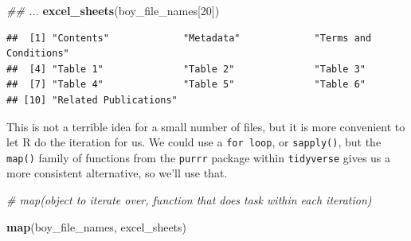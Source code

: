 \documentclass[
]{book}
\newenvironment{Shaded}{\begin{snugshade}}{\end{snugshade}}
\newcommand{\CommentTok}[1]{\textcolor[rgb]{0.56,0.35,0.01}{\textit{#1}}}
\newcommand{\DecValTok}[1]{\textcolor[rgb]{0.00,0.00,0.81}{#1}}
\newcommand{\KeywordTok}[1]{\textcolor[rgb]{0.13,0.29,0.53}{\textbf{#1}}}
\newcommand{\NormalTok}[1]{#1}
\begin{document}
\begin{Shaded}
\begin{Highlighting}[]
\CommentTok{\#\# ...}
\KeywordTok{excel\_sheets}\NormalTok{(boy\_file\_names[}\DecValTok{20}\NormalTok{])}
\end{Highlighting}
\end{Shaded}

\begin{verbatim}
##  [1] "Contents"             "Metadata"             "Terms and Conditions"
##  [4] "Table 1"              "Table 2"              "Table 3"             
##  [7] "Table 4"              "Table 5"              "Table 6"             
## [10] "Related Publications"
\end{verbatim}

This is not a terrible idea for a small number of files, but it is more convenient to let R do the iteration for us. We could use a \texttt{for\ loop}, or \texttt{sapply()}, but the \texttt{map()} family of functions from the \texttt{purrr} package within \texttt{tidyverse} gives us a more consistent alternative, so we'll use that.

\begin{Shaded}
\begin{Highlighting}[]
\CommentTok{\# map(object to iterate over, function that does task within each iteration)}

\KeywordTok{map}\NormalTok{(boy\_file\_names, excel\_sheets)}
\end{Highlighting}
\end{Shaded}
\end{document}
